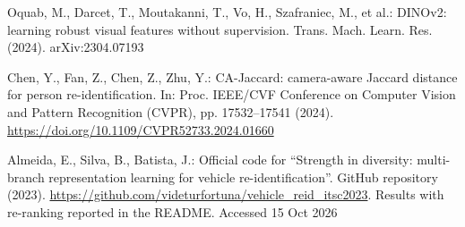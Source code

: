 Oquab, M., Darcet, T., Moutakanni, T., Vo, H., Szafraniec, M., et al.: DINOv2:
learning robust visual features without supervision. Trans. Mach. Learn. Res.
(2024). arXiv:2304.07193

Chen, Y., Fan, Z., Chen, Z., Zhu, Y.: CA-Jaccard: camera-aware Jaccard distance
for person re-identification. In: Proc. IEEE/CVF Conference on Computer Vision
and Pattern Recognition (CVPR), pp. 17532--17541 (2024).
\url{https://doi.org/10.1109/CVPR52733.2024.01660}

Almeida, E., Silva, B., Batista, J.: Official code for ``Strength in diversity:
multi-branch representation learning for vehicle re-identification''. GitHub
repository (2023). \url{https://github.com/videturfortuna/vehicle_reid_itsc2023}.
Results with re-ranking reported in the README. Accessed 15 Oct 2026
